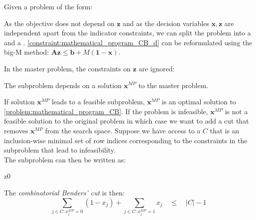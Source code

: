 Given a problem of the form:
As the objective does not depend on $\mathbf z$ and as the decision variables $\mathbf x, \mathbf z$ are independent apart from the indicator constraints, we can split the problem into a  and a . \cref{constraint:mathematical_program_CB_d} can be reformulated using the big-M method: $\mathbf A \mathbf z \leq \mathbf b + M(\mathbf 1- \mathbf x)$. 

In the master problem, the constraints on $\mathbf z$ are ignored: 

The subproblem depends on a solution $\mathbf x^{MP}$ to the master problem. 
\newpage
If solution $\mathbf x^{MP}$ leads to a feasible subproblem, $\mathbf x^{MP}$ is an optimal solution to \cref{problem:mathematical_program_CB}. If the problem is infeasible, $\mathbf x^{MP}$ is not a feasible solution to the original problem in which case we want to add a cut that removes $\mathbf x^{MP}$ from the search space. Suppose we have access to a  $C$ that is an inclusion-wise minimal set of row indices corresponding to the constraints in the subproblem that lead to infeasibility.\\
The subproblem can then be written as:
\begin{mini!}
    {\scriptstyle \mathbf z}{0}{}{}
\end{mini!}
The \textit{combinatorial Benders' cut} is then: 
\begin{equation*}
    \sum_{j \in C: x_j^{MP}=0} (1 - x_{j}) + \sum_{j \in C: x_j^{MP}=1} x_j \quad \leq \quad |C| -1
\end{equation*}

